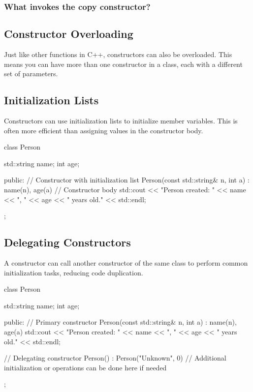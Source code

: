 \documentclass{report}
\begin{document}
    \subsubsection{What invokes the copy constructor?}
    \bigbreak \noindent 
    
    
    \bigbreak \noindent 
    \subsection{Constructor Overloading}
    \bigbreak \noindent 
    \begin{concept}
        Just like other functions in C++, constructors can also be overloaded. This means you can have more than one constructor in a class, each with a different set of parameters.
    \end{concept}

    \pagebreak
    \subsection{Initialization Lists}
    \bigbreak \noindent 
    \begin{concept}
        Constructors can use initialization lists to initialize member variables. This is often more efficient than assigning values in the constructor body.
    \end{concept}
    \bigbreak \noindent 
    \begin{cppcode}
  class Person {
    std::string name;
    int age;

public:
    // Constructor with initialization list
    Person(const std::string& n, int a) : name(n), age(a) {
        // Constructor body
        std::cout << "Person created: " << name << ", " << age << " years old." << std::endl;
    }  
};
    \end{cppcode}

    \bigbreak \noindent 
    \subsection{Delegating Constructors}
    \bigbreak \noindent 
    \begin{concept}
        A constructor can call another constructor of the same class to perform common initialization tasks, reducing code duplication.
    \end{concept}
    \bigbreak \noindent 
    \begin{cppcode}
class Person {
    std::string name;
    int age;

public:
    // Primary constructor
    Person(const std::string& n, int a) : name(n), age(a) {
        std::cout << "Person created: " << name << ", " << age << " years old." << std::endl;
    }

    // Delegating constructor
    Person() : Person("Unknown", 0) {
        // Additional initialization or operations can be done here if needed
    }
};
    \end{cppcode}
    
\end{document}
